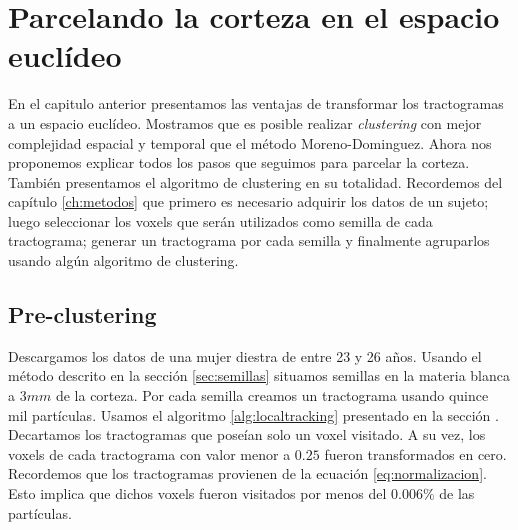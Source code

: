 \chapter{Parcelando la corteza en el espacio eucl\'ideo} 
\label{ch:nuestro}

En el capitulo anterior presentamos las ventajas de transformar los tractogramas
a un espacio eucl\'ideo. Mostramos que es posible realizar \textit{clustering} 
con mejor complejidad espacial y temporal que el m\'etodo Moreno-Dominguez. Ahora 
nos proponemos explicar todos los pasos que seguimos para parcelar la corteza.
Tambi\'en presentamos el algoritmo de clustering en su totalidad. Recordemos del
cap\'itulo \ref{ch:metodos} que primero es necesario adquirir los datos de un
sujeto; luego seleccionar los voxels que ser\'an utilizados como semilla de cada
tractograma; generar un tractograma por cada semilla y finalmente agruparlos 
usando alg\'un algoritmo de clustering. \\

\section{Pre-clustering}

Descargamos los datos de una mujer diestra de entre 23 y 26 a\~nos. Usando el
m\'etodo descrito en la secci\'on \ref{sec:semillas} situamos semillas
en la materia blanca a $3mm$ de la corteza. Por cada semilla creamos
un tractograma usando quince mil part\'iculas. Usamos el algoritmo \ref{alg:localtracking} presentado en la secci\'on \label{sec:convergencia}. Decartamos los tractogramas
que pose\'ian solo un voxel visitado. A su vez, los voxels de cada tractograma con
valor menor a $0.25$ fueron transformados en cero. Recordemos que los tractogramas
provienen de la ecuaci\'on \ref{eq:normalizacion}. Esto implica que dichos voxels
fueron visitados por menos del $0.006\%$ de las part\'iculas. \\

\settowidth{}
\addtolength\mylen{\parindent}

